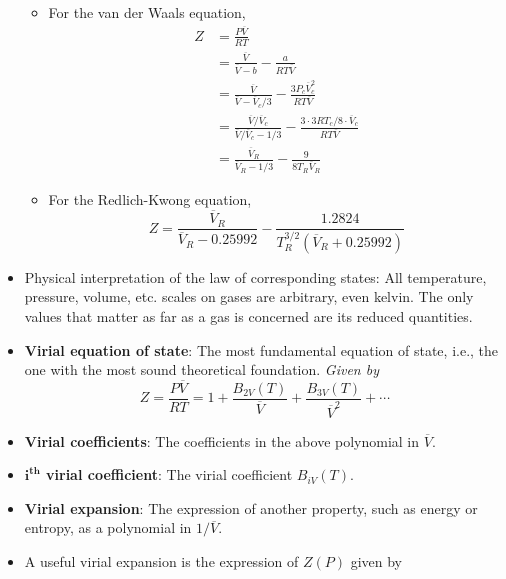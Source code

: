 \documentclass[../notes.tex]{subfiles}
\begin{document}
\begin{itemize}
    \begin{itemize}
        \item For the van der Waals equation,
        \begin{align*}
            Z &= \frac{P\overline{V}}{RT}\\
            &= \frac{\overline{V}}{\overline{V}-b}-\frac{a}{RT\overline{V}}\\
            &= \frac{\overline{V}}{\overline{V}-\overline{V}_c/3}-\frac{3P_c\overline{V}_c^2}{RT\overline{V}}\\
            &= \frac{\overline{V}/\overline{V}_c}{\overline{V}/\overline{V}_c-1/3}-\frac{3\cdot 3RT_c/8\cdot\overline{V}_c}{RT\overline{V}}\\
            &= \frac{\overline{V}_R}{\overline{V}_R-1/3}-\frac{9}{8T_R\overline{V}_R}
        \end{align*}
        \item For the Redlich-Kwong equation,
        \begin{equation*}
            Z = \frac{\overline{V}_R}{\overline{V}_R-0.25992}-\frac{1.2824}{T_R^{3/2}(\overline{V}_R+0.25992)}
        \end{equation*}
    \end{itemize}
    \item Physical interpretation of the law of corresponding states: All temperature, pressure, volume, etc. scales on gases are arbitrary, even kelvin. The only values that matter as far as a gas is concerned are its reduced quantities.
    \item \textbf{Virial equation of state}: The most fundamental equation of state, i.e., the one with the most sound theoretical foundation. \emph{Given by}
    \begin{equation*}
        Z = \frac{P\overline{V}}{RT}
        = 1+\frac{B_{2V}(T)}{\overline{V}}+\frac{B_{3V}(T)}{\overline{V}^2}+\cdots
    \end{equation*}
    \item \textbf{Virial coefficients}: The coefficients in the above polynomial in $\overline{V}$.
    \item \textbf{$\bm{i^\textbf{th}}$ virial coefficient}: The virial coefficient $B_{iV}(T)$.
    \item \textbf{Virial expansion}: The expression of another property, such as energy or entropy, as a polynomial in $1/\overline{V}$.
    \item A useful virial expansion is the expression of $Z(P)$ given by
    \begin{equation*}

\end{equation*}
\end{itemize}
\end{document}
